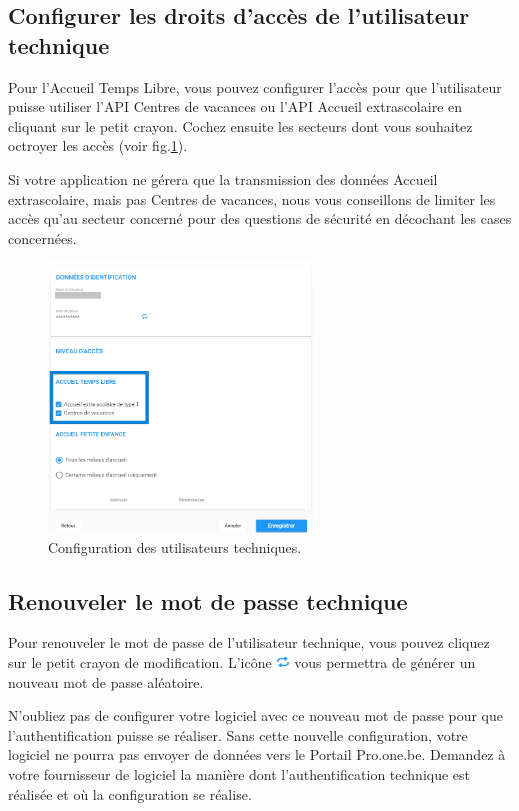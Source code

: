 \subsection{Configurer les droits d'accès de  l'utilisateur technique}

Pour l'Accueil Temps Libre, vous pouvez configurer l'accès pour que l'utilisateur puisse utiliser l'API Centres de vacances ou l'API Accueil extrascolaire en cliquant sur le petit crayon. Cochez ensuite les secteurs dont vous souhaitez octroyer les accès (voir fig.\ref{fig:config_user}). 

Si votre application ne gérera que la transmission des données Accueil extrascolaire, mais pas Centres de vacances, nous vous conseillons de limiter les accès qu'au secteur concerné pour des questions de sécurité en décochant les cases concernées.

\begin{figure}[h!]
    \centering
    \includegraphics[width=7cm,frame]{Images/api/config_user.png}
    \caption{Configuration des utilisateurs techniques.}
    \label{fig:config_user}
\end{figure}

\subsection{Renouveler le mot de passe technique}
Pour renouveler le mot de passe de l'utilisateur technique, vous pouvez cliquez sur le petit crayon de modification. L'icône \includegraphics[width=0.35cm]{Images/icon/button_renew_mdp.png} vous permettra de générer un nouveau mot de passe aléatoire. 

N'oubliez pas de configurer votre logiciel avec ce nouveau mot de passe pour que l'authentification puisse se réaliser. Sans cette nouvelle configuration, votre logiciel ne pourra pas envoyer de données vers le Portail Pro.one.be. Demandez à votre fournisseur de logiciel la manière dont l'authentification technique est réalisée et où la configuration se réalise. 

